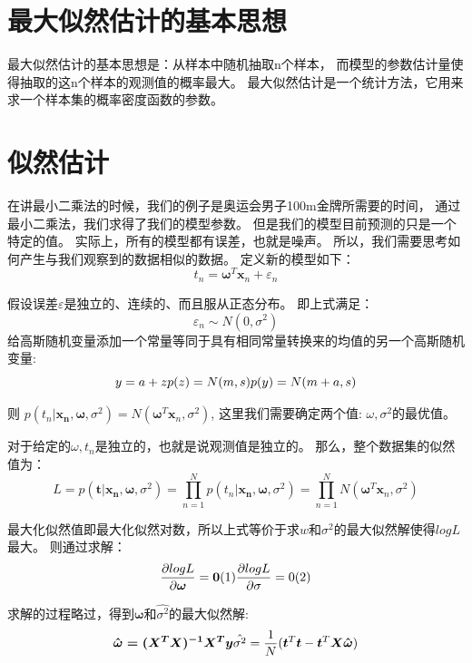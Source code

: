 \documentclass[a4paper,12pt]{book}
\begin{document}
    \section{最大似然估计的基本思想}

    最大似然估计的基本思想是：从样本中随机抽取n个样本，
    而模型的参数估计量使得抽取的这n个样本的观测值的概率最大。
    最大似然估计是一个统计方法，它用来求一个样本集的概率密度函数的参数。
    
    \section{似然估计}
    
    在讲最小二乘法的时候，我们的例子是奥运会男子100m金牌所需要的时间，
    通过最小二乘法，我们求得了我们的模型参数。
    但是我们的模型目前预测的只是一个特定的值。
    实际上，所有的模型都有误差，也就是噪声。
    所以，我们需要思考如何产生与我们观察到的数据相似的数据。
    定义新的模型如下：
    $$t_n = \boldsymbol{\omega}^T\boldsymbol{x}_n+\varepsilon_n$$
    
    假设误差$\varepsilon$是独立的、连续的、而且服从正态分布。
    即上式满足：
    $$
    \varepsilon_n \sim N(0, \sigma^2)
    $$
    给高斯随机变量添加一个常量等同于具有相同常量转换来的均值的另一个高斯随机变量:
    $$
    y = a + z \\
    p(z) = N(m, s) \\
    p(y) = N(m+a, s) \\
    $$
    
    则 $p(t_n|\boldsymbol{x_n, \omega, }\sigma^2) = N(\boldsymbol{\omega}^T\boldsymbol{x}_n, \sigma^2)$, 这里我们需要确定两个值: $\omega, \sigma^2$的最优值。
    
    对于给定的$\omega, t_n$是独立的，也就是说观测值是独立的。
    那么，整个数据集的似然值为：
    $$
    L = p(\boldsymbol{t|x_n, \omega, }\sigma^2) = \prod_{n=1}^Np(t_n|\boldsymbol{x_n, \omega, }\sigma^2) =\prod_{n=1}^NN(\boldsymbol{\omega}^T\boldsymbol{x}_n, \sigma^2)
    $$ 
    
    最大化似然值即最大化似然对数，所以上式等价于求$w 和 
    \sigma^2$的最大似然解使得$log L$最大。
    则通过求解：
    $$
    \frac{\partial{log L}}{\partial{\boldsymbol{\omega}}} = \boldsymbol{0}(1)\\
    \frac{\partial{log L}}{\partial{\sigma}}=0(2)
    $$
    
    求解的过程略过，得到$\boldsymbol{\omega}和\hat{\sigma^2}$的最大似然解:
    $$
    \boldsymbol{\hat{\omega}=(X^TX)^{-1}X^Ty}\\
    \hat{\sigma^2} = \frac{1}{N}(\boldsymbol{t}^T\boldsymbol{t}-\boldsymbol{t}^T\boldsymbol{X\hat{\omega}})
    $$
    
\end{document}
